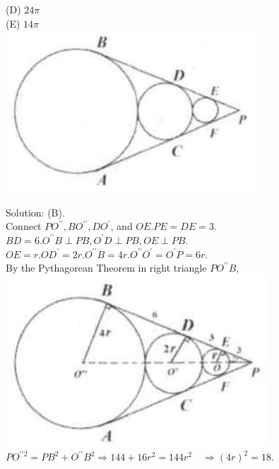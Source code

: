 \documentclass[10pt]{article}
\begin{document}
(D) \(24 \pi\)\\
(E) \(14 \pi\)\\
\includegraphics[max width=\textwidth, center]{2025_04_17_97bc1f7e44d93c271a88g-176(3)}

Solution: (B).\\
Connect \(P O^{\prime \prime}, B O^{\prime \prime}, D O^{\prime}\), and \(O E . P E=D E=3\).\\
\(B D=6 . O^{\prime \prime} B \perp P B, O^{\prime} D \perp P B, O E \perp P B\).\\
\(O E=r . O D^{\prime}=2 r . O^{\prime \prime} B=4 r . O^{\prime \prime} O^{\prime}=O^{\prime} P=6 r\).\\
By the Pythagorean Theorem in right triangle \(P O^{\prime \prime} B\),\\
\includegraphics[max width=\textwidth, center]{2025_04_17_97bc1f7e44d93c271a88g-176(1)}\\
\(P O^{\prime \prime 2}=P B^{2}+O^{\prime \prime} B^{2} \Rightarrow 144+16 r^{2}=144 r^{2} \quad \Rightarrow(4 r)^{2}=18\).
\end{document}
